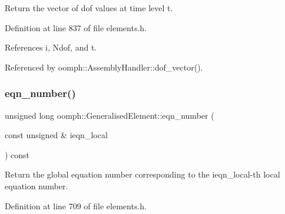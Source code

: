 Return the vector of dof values at time level t. 



Definition at line 837 of file elements.\+h.



References i, Ndof, and t.



Referenced by oomph\+::\+Assembly\+Handler\+::dof\+\_\+vector().

\mbox{\label{classoomph_1_1GeneralisedElement_a37ac5a1d5234fa931ab710c0c74d55d2}} 
\subsubsection{\texorpdfstring{eqn\+\_\+number()}{eqn\_number()}}
{\footnotesize\ttfamily unsigned long oomph\+::\+Generalised\+Element\+::eqn\+\_\+number (\begin{DoxyParamCaption}\item[{const unsigned \&}]{ieqn\+\_\+local }\end{DoxyParamCaption}) const\hspace{0.3cm}{\ttfamily [inline]}}



Return the global equation number corresponding to the ieqn\+\_\+local-\/th local equation number. 



Definition at line 709 of file elements.\+h.



